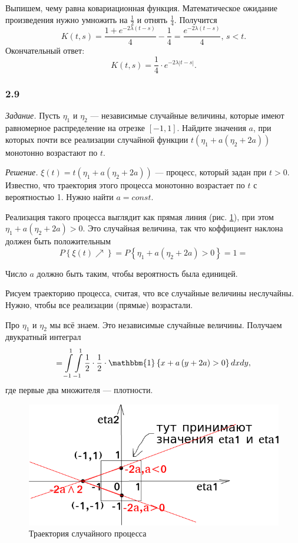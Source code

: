 Выпишем, чему равна ковариационная функция.
Математическое ожидание произведения нужно умножить на $ \frac{1}{2}$ и отнять $ \frac{1}{4}$.
Получится
$$K \left( t, s \right) =
  \frac{1 + e^{-2 \lambda \left( t - s \right) }}{4} - \frac{1}{4} =
  \frac{e^{-2 \lambda \left( t - s \right) }}{4}, \,
  s < t.$$
Окончательный ответ:
$$K \left( t, s \right) =
  \frac{1}{4} \cdot e^{-2 \lambda \left| t - s \right| }.$$

\subsubsection*{2.9}

\textit{Задание.}
Пусть $ \eta_1$ и $ \eta_2$ --- независимые случайные величины,
которые имеют равномерное распределение на отрезке $ \left[ -1, 1 \right] $.
Найдите значения $a$, при которых почти все реализации случайной функции
$t \left( \eta_1 + a \left( \eta_2 + 2a \right) \right) $ монотонно возрастают по $t$.

\textit{Решение.}
$ \xi \left( t \right) = t \left( \eta_1 + a \left( \eta_2 + 2a \right) \right) $ --- процесс,
который задан при $t > 0$.
Известно, что траектория этого процесса монотонно возрастает по $t$ с вероятностью 1.
Нужно найти $a = const$.

Реализация такого процесса выглядит как прямая линия (рис. \ref{fig:29}),
при этом $ \eta_1 + a \left( \eta_2 + 2a \right) > 0$.
Это случайная величина, так что коффициент наклона должен быть положительным
$$P \left\{ \xi \left( t \right) \nearrow \right\} =
  P \left\{ \eta_1 + a \left( \eta_2 + 2a \right) > 0 \right\} =
  1 =$$

Число $a$ должно быть таким, чтобы вероятность была единицей.

Рисуем траекторию процесса, считая, что все случайные величины неслучайны.
Нужно, чтобы все реализации (прямые) возрастали.

Про $ \eta_1 $ и $ \eta_2$ мы всё знаем.
Это независимые случайные величины.
Получаем двукратный интеграл
$$= \int \limits_{-1}^1 \int \limits_{-1}^1
    \frac{1}{2} \cdot \frac{1}{2} \cdot \mathbbm{1} \left\{ x + a \left( y + 2a \right) > 0 \right\}
  dxdy,$$
где первые два множителя --- плотности.

\begin{figure}[h!]
 \centering
 \includegraphics[width=.5\textwidth]{./pictures/2_9.png}
 \caption{Траектория случайного процесса}
 \label{fig:29}
\end{figure}

